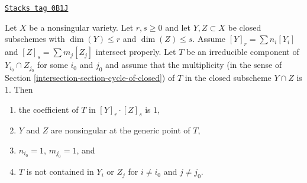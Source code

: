 \begin{lemma}
\label{intersection-lemma-transversal-subschemes}
\href{https://stacks.math.columbia.edu/tag/0B1J}{\texttt{Stacks tag 0B1J}}

Let $X$ be a nonsingular variety. Let $r, s \geq 0$ and let
$Y, Z \subset X$ be closed subschemes with $\dim(Y) \leq r$ and
$\dim(Z) \leq s$. Assume $[Y]_r = \sum n_i[Y_i]$ and
$[Z]_s = \sum m_j[Z_j]$ intersect properly.
Let $T$ be an irreducible component of $Y_{i_0} \cap Z_{j_0}$
for some $i_0$ and $j_0$ and assume that the multiplicity
(in the sense of Section \ref{intersection-section-cycle-of-closed}) of $T$
in the closed subscheme $Y \cap Z$ is $1$.
Then
\begin{enumerate}
\item the coefficient of $T$ in $[Y]_r \cdot [Z]_s$ is $1$,
\item $Y$ and $Z$ are nonsingular at the generic point of $T$,
\item $n_{i_0} = 1$, $m_{j_0} = 1$, and
\item $T$ is not contained in $Y_i$ or $Z_j$ for $i \not = i_0$ and
$j \not = j_0$.
\end{enumerate}
\end{lemma}

